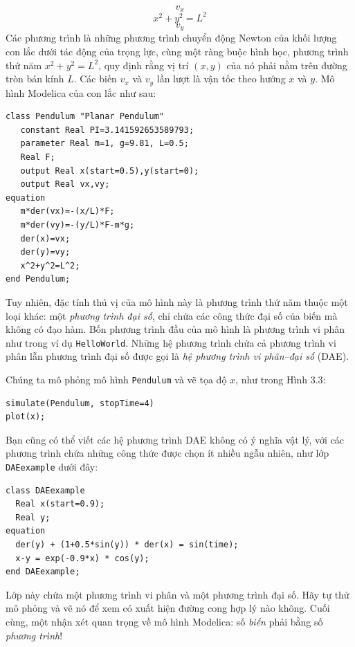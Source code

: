 \begin{equation}v_x\tag{3.7}\end{equation}
\begin{equation}x^2+y^2=L^2\tag{3.8}\end{equation}
\begin{equation}v_y\tag{3.9}\end{equation}
Các phương trình là những phương trình chuyển động Newton của khối lượng con lắc dưới tác động của trọng lực, cùng một ràng buộc hình học, phương trình thứ năm $x^2+y^2=L^2$, quy định rằng vị trí $(x,y)$ của nó phải nằm trên đường tròn bán kính $L$. Các biến $v_x$ và $v_y$ lần lượt là vận tốc theo hướng $x$ và $y$. Mô hình Modelica của con lắc như sau:
\begin{verbatim}
class Pendulum "Planar Pendulum"
   constant Real PI=3.141592653589793;
   parameter Real m=1, g=9.81, L=0.5;
   Real F;
   output Real x(start=0.5),y(start=0);
   output Real vx,vy;
equation
   m*der(vx)=-(x/L)*F;
   m*der(vy)=-(y/L)*F-m*g;
   der(x)=vx;
   der(y)=vy;
   x^2+y^2=L^2;
end Pendulum;
\end{verbatim}
Tuy nhiên, đặc tính thú vị của mô hình này là phương trình thứ năm thuộc một loại khác: một \emph{phương trình đại số}, chỉ chứa các công thức đại số của biến mà không có đạo hàm. Bốn phương trình đầu của mô hình là phương trình vi phân như trong ví dụ \texttt{HelloWorld}. Những hệ phương trình chứa cả phương trình vi phân lẫn phương trình đại số được gọi là \emph{hệ phương trình vi phân--đại số} (DAE).

Chúng ta mô phỏng mô hình \texttt{Pendulum} và vẽ tọa độ $x$, như trong Hình 3.3:
\begin{verbatim}
simulate(Pendulum, stopTime=4)
plot(x);
\end{verbatim}


Bạn cũng có thể viết các hệ phương trình DAE không có ý nghĩa vật lý, với các phương trình chứa những công thức được chọn ít nhiều ngẫu nhiên, như lớp \texttt{DAEexample} dưới đây:
\begin{verbatim}
class DAEexample
  Real x(start=0.9);
  Real y;
equation
  der(y) + (1+0.5*sin(y)) * der(x) = sin(time);
  x-y = exp(-0.9*x) * cos(y);
end DAEexample;
\end{verbatim}
Lớp này chứa một phương trình vi phân và một phương trình đại số. Hãy tự thử mô phỏng và vẽ nó để xem có xuất hiện đường cong hợp lý nào không. Cuối cùng, một nhận xét quan trọng về mô hình Modelica: số \emph{biến} phải bằng số \emph{phương trình}!

